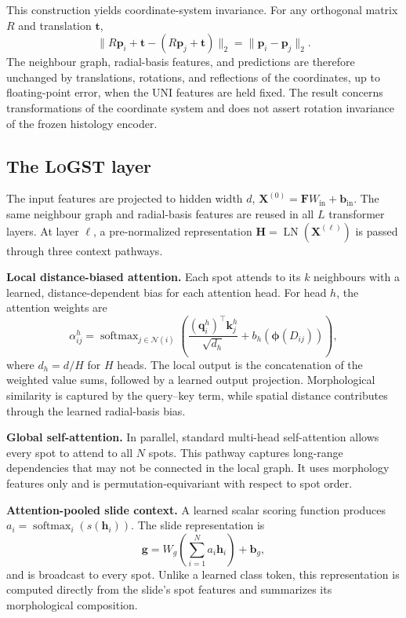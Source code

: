\documentclass[10pt,twocolumn,letterpaper]{article}
\newcommand{\morph}{\textsc{LoGST}}
\begin{document}
This construction yields coordinate-system invariance. For any orthogonal matrix $R$ and translation
$\mathbf{t}$,
\begin{equation}
\lVert R\mathbf{p}_i+\mathbf{t}-(R\mathbf{p}_j+\mathbf{t})\rVert_2
=\lVert\mathbf{p}_i-\mathbf{p}_j\rVert_2.
\end{equation}
The neighbour graph, radial-basis features, and predictions are therefore unchanged by translations,
rotations, and reflections of the coordinates, up to floating-point error, when the UNI features are
held fixed. The result concerns transformations of the coordinate system and does not assert
rotation invariance of the frozen histology encoder.

\subsection{The \morph{} layer}
The input features are projected to hidden width $d$,
$\mathbf{X}^{(0)}=\mathbf{F}W_{\mathrm{in}}+\mathbf{b}_{\mathrm{in}}$. The same neighbour graph and
radial-basis features are reused in all $L$ transformer layers. At layer $\ell$, a pre-normalized
representation $\mathbf{H}=\operatorname{LN}(\mathbf{X}^{(\ell)})$ is passed through three context
pathways.

\noindent\textbf{Local distance-biased attention.} Each spot attends to its $k$ neighbours with a
learned, distance-dependent bias for each attention head. For head $h$, the attention weights are
\begin{equation}
\alpha_{ij}^{h}=\operatorname{softmax}_{j\in\mathcal{N}(i)}\!\left(
\frac{(\mathbf{q}_i^{h})^\top\mathbf{k}_j^{h}}{\sqrt{d_h}}
+b_h\!\left(\boldsymbol{\phi}(D_{ij})\right)\right),
\end{equation}
where $d_h=d/H$ for $H$ heads. The local output is the concatenation of the weighted value sums,
followed by a learned output projection. Morphological similarity is captured by the query--key
term, while spatial distance contributes through the learned radial-basis bias.

\noindent\textbf{Global self-attention.} In parallel, standard multi-head self-attention
\cite{vaswani2017attention} allows every spot to attend to all $N$ spots. This pathway captures
long-range dependencies that may not be connected in the local graph. It uses morphology features
only and is permutation-equivariant with respect to spot order.

\noindent\textbf{Attention-pooled slide context.} A learned scalar scoring function produces
$a_i=\operatorname{softmax}_{i}(s(\mathbf{h}_i))$. The slide representation is
\begin{equation}
\mathbf{g}=W_g\left(\sum_{i=1}^{N}a_i\mathbf{h}_i\right)+\mathbf{b}_g,
\end{equation}
and is broadcast to every spot. Unlike a learned class token, this representation is computed
directly from the slide's spot features and summarizes its morphological composition.
\end{document}
